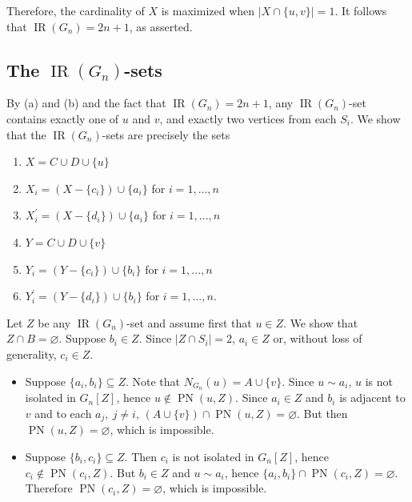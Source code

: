 \documentclass[12pt]{article}%
\begin{document}
\bigskip

Therefore, the cardinality of $X$ is maximized when $|X\cap\{u,v\}|=1$. It
follows that $\operatorname{IR}(G_{n})=2n+1$, as asserted.

\subsection{The $\operatorname{IR}(G_{n})$-sets}

By (a) and (b) and the fact that $\operatorname{IR}(G_{n})=2n+1$, any
$\operatorname{IR}(G_{n})$-set contains exactly one of $u$ and $v$, and
exactly two vertices from each $S_{i}$. We show that the $\operatorname{IR}%
(G_{n})$-sets are precisely the sets

\begin{enumerate}
\item $X=C\cup D\cup\{u\}$

\item $X_{i}=(X-\{c_{i}\})\cup\{a_{i}\}$ for $i=1,...,n$

\item $X_{i}^{\prime}=(X-\{d_{i}\})\cup\{a_{i}\}$ for $i=1,...,n$

\item $Y=C\cup D\cup\{v\}$

\item $Y_{i}=(Y-\{c_{i}\})\cup\{b_{i}\}$ for $i=1,...,n$

\item $Y_{i}^{\prime}=(Y-\{d_{i}\})\cup\{b_{i}\}$ for $i=1,...,n.$
\end{enumerate}

Let $Z$ be any $\operatorname{IR}(G_{n})$-set and assume first that $u\in Z$.
We show that $Z\cap B=\varnothing$. Suppose $b_{i}\in Z$. Since $|Z\cap
S_{i}|=2$, $a_{i}\in Z$ or, without loss of generality, $c_{i}\in Z$.

\begin{itemize}
\item Suppose $\{a_{i},b_{i}\}\subseteq Z$. Note that $N_{G_{n}}%
(u)=A\cup\{v\}$. Since $u\sim a_{i}$, $u$ is not isolated in $G_{n}[Z]$, hence
$u\notin\operatorname{PN}(u,Z)$. Since $a_{i}\in Z$ and $b_{i}$ is adjacent to
$v$ and to each $a_{j},\ j\neq i$, $(A\cup\{v\})\cap\operatorname{PN}%
(u,Z)=\varnothing$. But then $\operatorname{PN}(u,Z)=\varnothing$, which is impossible.

\item Suppose $\{b_{i},c_{i}\}\subseteq Z$. Then $c_{i}$ is not isolated in
$G_{n}[Z]$, hence $c_{i}\notin\operatorname{PN}(c_{i},Z)$. But $b_{i}\in Z$
and $u\sim a_{i}$, hence $\{a_{i},b_{i}\}\cap\operatorname{PN}(c_{i}%
,Z)=\varnothing$. Therefore $\operatorname{PN}(c_{i},Z)=\varnothing$, which is impossible.
\end{itemize}
\end{document}
